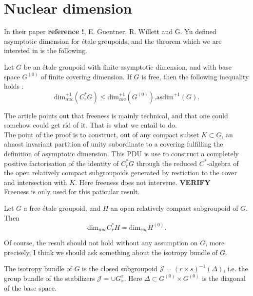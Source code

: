 \section{Nuclear dimension}

In their paper \textbf{reference !}, E. Guentner, R. Willett and G. Yu defined asymptotic dimension for étale groupoids, and the theorem which we are intersted in is the following.

\begin{thm}
Let $G$ be an étale groupoid with finite asymptotic dimension, and with base space $G^{(0)}$ of finite covering dimension. If $G$ is free, then the following inequality holds :
\[\text{dim}^{+1}_{nuc}(C^*_rG)\leq \text{dim}^{+1}_{cov}(G^{(0)}).\text{asdim}^{+1}(G).\] 
\end{thm}

The article points out that freeness is mainly technical, and that one could somehow could get rid of it. That is what we entail to do. \\

The point of the proof is to construct, out of any compact subset $K\subset G$, an almost invariant partition of unity subordinate to a covering fulfilling the definition of asymptotic dimension. This PDU is use to construct a completely positive factorisation of the identity of $C^*_rG$ through the reduced $C^*$-algebra of the open relatively compact subgroupoids generated by restiction to the cover and intersection with $K$. Here freeness does not intervene. \textbf{VERIFY} \\

Freeness is only used for this paticular result.

\begin{prop}
Let $G$ a free étale groupoid, and $H$ an open relatively compact subgroupoid of $G$. Then 
\[\text{dim}_{nuc} C^*_r H = \text{dim}_{cov} H^{(0)}.\]
\end{prop}

Of course, the result should not hold without any assumption on $G$, more precisely, I think we should ask something about the isotropy bundle of $G$.\\

\begin{definition}
The isotropy bundle of $G$ is the closed subgroupoid $\mathcal J = (r\times s)^{-1}(\Delta)$, i.e. the group bundle of the stabilizers $\mathcal J = \cup G_x^x$. Here $\Delta\subset G^{(0)}\times G^{(0)}$ is the diagonal of the base space. 
\end{definition}

